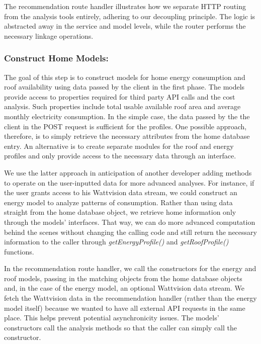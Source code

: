 \documentclass[pageno]{jpaper}
\begin{document}
The recommendation route handler illustrates how we separate HTTP routing from the analysis tools entirely, adhering to our decoupling principle. The logic is abstracted away in the service and model levels, while the router performs the necessary linkage operations.

\bigskip

\subsubsection{Construct Home Models:}
The goal of this step is to construct models for home energy consumption and roof availability using data passed by the client in the first phase. The models provide access to properties required for third party API calls and the cost analysis. Such properties include total usable available roof area and average monthly electricity consumption. In the simple case, the data passed by the  the client in the POST request is sufficient for the profiles. One possible approach, therefore, is to simply retrieve the necessary attributes from the home database entry. An alternative is to create separate modules for the roof and energy profiles and only provide access to the necessary data through an interface.

We use the latter approach in anticipation of another developer adding methods to operate on the user-inputted data for more advanced analyses. For instance, if the user grants access to his Wattvision data stream, we could construct an energy model to analyze patterns of consumption. Rather than using data straight from the home database object, we retrieve home information only through the models' interfaces. That way, we can do more advanced computation behind the scenes without changing the calling code and still return the necessary information to the caller through {\em getEnergyProfile()} and {\em getRoofProfile()} functions.

In the recommendation route handler, we call the constructors for the energy and roof models, passing in the matching objects from the home database objects and, in the case of the energy model, an optional Wattvision data stream. We fetch the Wattvision data in the recommendation handler (rather than the energy model itself) because we wanted to have all external API requests in the same place. This helps prevent potential asynchronicity issues. The models' constructors call the analysis methods so that the caller can simply call the constructor.
\end{document}
